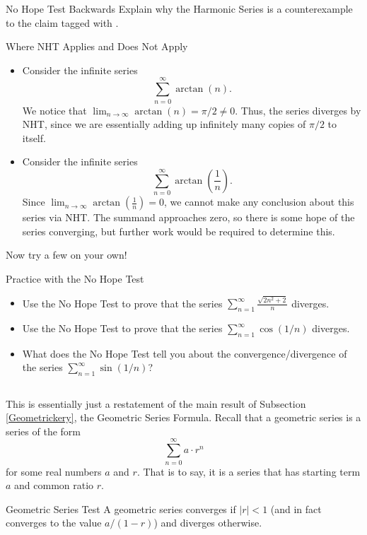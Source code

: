 \begin{exercise}{No Hope Test Backwards \Coffeecup}
Explain why the Harmonic Series is a counterexample to the claim tagged with \Frowny.  
\vspace*{.5in}
\end{exercise}

\begin{example}{Where NHT Applies and Does Not Apply}
\begin{itemize}
\item Consider the infinite series $$ \sum_{n=0}^\infty \arctan(n). $$  We notice that $\lim_{n\to \infty}\arctan(n)=\pi/2\neq 0$.  Thus, the series diverges by NHT, since we are essentially adding up infinitely many copies of $\pi/2$ to itself.
\item Consider the infinite series $$ \sum_{n=0}^\infty \arctan\left(\frac{1}{n}\right).$$  Since $\lim_{n\to \infty}\arctan\left(\frac{1}{n}\right)=0$, we cannot make any conclusion about this series via NHT.  The summand approaches zero, so there is some hope of the series converging, but further work would be required to determine this.
\end{itemize}
\end{example}
Now try a few on your own!

\begin{exercise}{Practice with the No Hope Test \Coffeecup \Coffeecup}
\begin{itemize}
\item Use the No Hope Test to prove that the series $ \sum_{n=1}^\infty \frac{\sqrt{2n^2+2}}{n}$ diverges.
\vspace*{.5in}
\item Use the No Hope Test to prove that the series $ \sum_{n=1}^\infty \cos(1/n)$ diverges.
\vspace*{.5in}
\item What does the No Hope Test tell you about the convergence/divergence of the series $ \sum_{n=1}^\infty \sin(1/n)$?  
\vspace*{.5in}
\end{itemize}
\end{exercise}

\subsection{}
This is essentially just a restatement of the main result of Subsection \ref{Geometrickery}, the Geometric Series Formula.  Recall that a geometric series is a series of the form $$ \sum_{n=0}^\infty a\cdot r^n$$ for some real numbers $a$ and $r$.  That is to say, it is a series that has starting term $a$ and common ratio $r$.
\begin{theorem}{Geometric Series Test}
A geometric series converges if $|r|<1$ (and in fact converges to the value $a/(1-r)$) and diverges otherwise.
\end{theorem}

